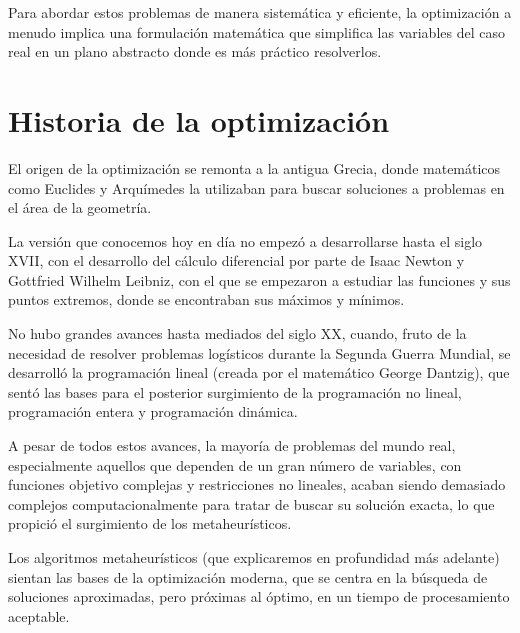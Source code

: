 \documentclass[12pt,a4paper]{book}
\begin{document}
Para abordar estos problemas de manera sistemática y eficiente, la optimización a menudo implica una formulación matemática que simplifica las variables del caso real en un plano abstracto donde es más práctico resolverlos. 

\section{Historia de la optimización}
El origen de la optimización se remonta a la antigua Grecia, donde matemáticos como Euclides y Arquímedes la utilizaban para buscar soluciones a problemas en el área de la geometría.

La versión que conocemos hoy en día no empezó a desarrollarse hasta el siglo XVII, con el desarrollo del cálculo diferencial por parte de Isaac Newton y Gottfried Wilhelm Leibniz, con el que se empezaron a estudiar las funciones y sus puntos extremos,
donde se encontraban sus máximos y mínimos.

No hubo grandes avances hasta mediados del siglo XX, cuando, fruto de la necesidad de resolver problemas logísticos durante la Segunda Guerra Mundial, se desarrolló la programación lineal (creada por el matemático George Dantzig),
que sentó las bases para el posterior surgimiento de la programación no lineal, programación entera y programación dinámica.

A pesar de todos estos avances, la mayoría de problemas del mundo real, especialmente aquellos que dependen de un gran número de variables, con funciones objetivo complejas y restricciones no lineales,
acaban siendo demasiado complejos computacionalmente para tratar de buscar su solución exacta, lo que propició el surgimiento de los metaheurísticos.

Los algoritmos metaheurísticos (que explicaremos en profundidad más adelante) sientan las bases de la optimización moderna, que se centra en la búsqueda de soluciones aproximadas, pero próximas al óptimo, en un tiempo de procesamiento aceptable.
\end{document}
